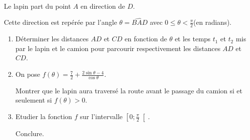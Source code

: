 \begin{center}
\end{center}
\\
Le lapin part du point $A$ en direction de $D$.
\par
Cette direction est repérée par l'angle $\theta  =\widehat{BAD}$ avec $0 \leqslant  \theta  < \frac{\pi }{2}$(en radians).
\begin{enumerate}
     \item
     Déterminer les distances $AD$ et $CD$ en fonction de $\theta $ et   les temps $t_{1}$ et $t_{2}$ mis par le lapin et le camion pour  parcourir respectivement les distances $AD$ et $CD$.
     \item
     On pose $f\left(\theta \right)=\frac{7}{2}+\frac{2 \sin \theta -4}{\cos \theta }$.
     \par
     Montrer que le lapin aura traversé la route avant le passage du camion si et seulement si $f\left(\theta \right) > 0$.
     \item
     Etudier la fonction $f$ sur l'intervalle $\left[0 ; \frac{\pi }{2}\right[$.
     \par
     Conclure.
\end{enumerate}

